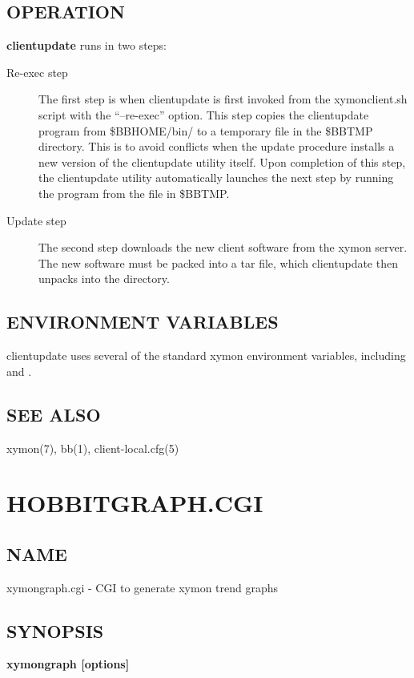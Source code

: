 \subsection{OPERATION}
\textbf{clientupdate}
 runs in two steps: 

 \begin{description}
\item[Re-exec step] The first step is when clientupdate is first invoked from the xymonclient.sh script with the ``--re-exec'' option. This step copies the clientupdate program from \$BBHOME/bin/ to a temporary file in the \$BBTMP directory. This is to avoid conflicts when the update procedure installs a new version of the clientupdate utility itself. Upon completion of this step, the clientupdate utility automatically launches the next step by running the program from the file in \$BBTMP. 

 

\item[Update step] The second step downloads the new client software from the xymon server. The new software must be packed into a tar file, which clientupdate then unpacks into the  directory. 

 


\end{description}

\subsection{ENVIRONMENT VARIABLES}
 clientupdate uses several of the standard xymon environment variables, including 
 and 
. 

 
\subsection{SEE ALSO}
xymon(7), bb(1), client-local.cfg(5) 

%
\newpage
\section{HOBBITGRAPH.CGI}


\subsection{NAME}
 xymongraph.cgi - CGI to generate xymon trend graphs \subsection{SYNOPSIS}
\textbf{xymongraph [options]}


